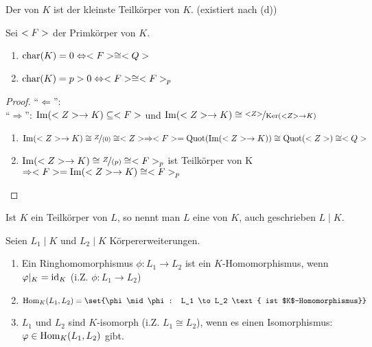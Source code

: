 \begin{definition}[Primkörper]
	Der  von $K$ ist der kleinste Teilkörper von $K$. (existiert nach (d)) %
\end{definition}

\begin{proposition}
	Sei $<F>$ der Primkörper von $K$.
	\begin{enumerate}[label=(\alph*)]
		\item $\operatorname{char}(K)  = 0 \Leftrightarrow <F> \cong <Q>$
		\item $\operatorname{char}(K)  = p > 0 \Leftrightarrow <F> \cong <F>_p$
	\end{enumerate}
\end{proposition}

\begin{proof}
	``$\Leftarrow$'': \\ %
	``$\Rightarrow$'': $\operatorname{Im}(<Z> \to K) \subseteq <F>$ und $\Image(\Z \to K) \cong \lnkset{\Z}{\Ker(\Z \to K)}$
	\begin{enumerate}[label=(\alph*)]
		\item $\Image(\Z \to K) \cong \lnkset{Z}{(0)} \cong \Z \Rightarrow \field = \Quot(\Image(\Z \to K)) \cong \Quot(\Z) \cong \Q$
		\item $\Image(\Z \to K) \cong \lnkset{Z}{(p)} \cong \Fp$ ist Teilkörper von K $\Rightarrow <F> = \operatorname{Im}(<Z> \to K) \cong <F>_p$
	\end{enumerate}
\end{proof}

\begin{definition}[Körpererweiterung]
	Ist $K$ ein Teilkörper von $L$, so nennt man $L$ eine  von $K$, auch geschrieben $L \mid K$.
\end{definition}

\begin{definition}[$K$-Homomorphismus]
	Seien $L_1 \mid K$ und $L_2 \mid K$ Körpererweiterungen.
	\begin{enumerate}
		\item Ein Ringhomomorphismus $\phi\colon L_1 \to L_2$ ist ein $K$-Homomorphismus, wenn $\varphi\vert_K = \operatorname{id}_K$ (i.Z. $\phi: L_1 \to L_2$)
		\item $\Hom_K(L_1,L_2) = \set{\phi \mid \phi: L_1 \to L_2 \text{ ist $K$-Homomorphismus}}$
		\item $L_1$ und $L_2$ sind $K$-isomorph (i.Z. $L_1 \cong L_2$), wenn es einen Isomorphismus: $\varphi \in \operatorname{Hom}_K(L_1, L_2)$ gibt.
	\end{enumerate}
\end{definition}

